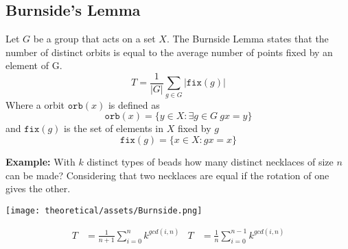 \subsection{Burnside's Lemma}

Let $G$ be a group that acts on a set $X$. The Burnside Lemma states that the number of distinct orbits is equal to the average number of points fixed by an element of G.
$$T = \frac{1}{|G|} \sum_{g \in G} |\texttt{fix}(g)|$$
Where a orbit $\texttt{orb}(x)$ is defined as
$$\texttt{orb}(x) = \{y \in X : \exists g \in G \ gx = y \}$$
and $\texttt{fix}(g)$ is the set of elements in $X$ fixed by $g$
$$\texttt{fix}(g) = \{x \in X : gx = x\}$$

\textbf{Example:} With $k$ distinct types of beads how many distinct necklaces of size $n$ can be made? Considering that two necklaces are equal if the rotation of one gives the other.

\begin{center}
\texttt{[image: theoretical/assets/Burnside.png]}
\end{center}

\begin{align*}
T &= \frac{1}{n+1} \sum_{i=0}^{n}k^{gcd(i, n)} & T &= \frac{1}{n} \sum_{i=0}^{n-1}k^{gcd(i, n)}
\end{align*}
